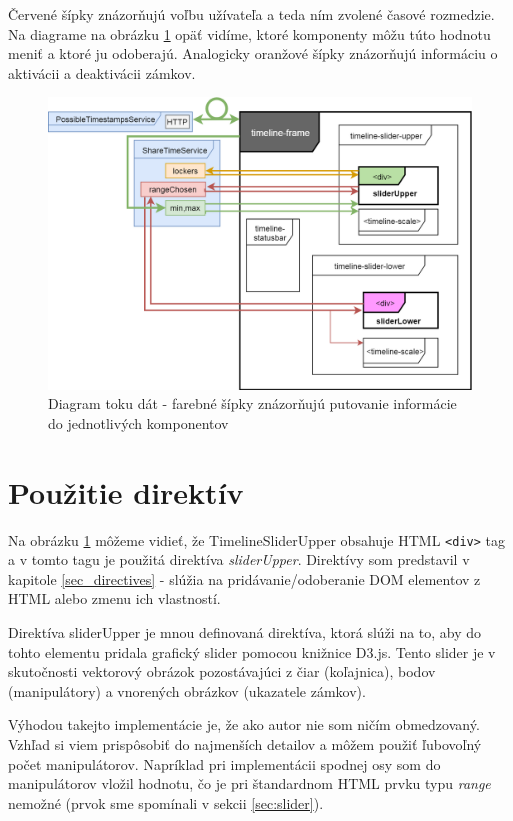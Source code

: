 \documentclass[
  digital, %
  twoside, %
  notable,   %
  nolof,   %
  nolot,   %
]{fithesis3}
\begin{document}
Červené šípky znázorňujú voľbu užívateľa a teda ním zvolené časové rozmedzie. Na diagrame na obrázku \ref{data_diagram} opäť vidíme, ktoré komponenty môžu túto hodnotu meniť a ktoré ju odoberajú. Analogicky oranžové šípky znázorňujú informáciu o aktivácii a deaktivácii zámkov.

\begin{figure}[H]
	\center
	\includegraphics[width=1.0\linewidth]{data_diagram}
	\caption{Diagram toku dát - farebné šípky znázorňujú putovanie informácie do jednotlivých komponentov}
	\label{data_diagram}
\end{figure}

\section{Použitie direktív}
Na obrázku \ref{data_diagram} môžeme vidieť, že TimelineSliderUpper obsahuje HTML \texttt{<div>} tag a v tomto tagu je použitá direktíva \textit{sliderUpper}. Direktívy som predstavil v kapitole \ref{sec_directives} - slúžia na pridávanie/odoberanie DOM elementov z HTML alebo zmenu ich vlastností.

Direktíva sliderUpper je mnou definovaná direktíva, ktorá slúži na to, aby do tohto elementu pridala grafický slider pomocou knižnice D3.js. Tento slider je v skutočnosti vektorový obrázok pozostávajúci z čiar (koľajnica), bodov (manipulátory) a vnorených obrázkov (ukazatele zámkov).

Výhodou takejto implementácie je, že ako autor nie som ničím obmedzovaný. Vzhľad si viem prispôsobiť do najmenších detailov a môžem použiť ľubovoľný počet manipulátorov. Napríklad pri implementácii spodnej osy som do manipulátorov vložil hodnotu, čo je pri štandardnom HTML prvku typu \textit{range} nemožné (prvok sme spomínali v sekcii \ref{sec:slider}).
\end{document}

